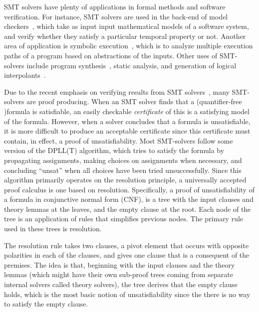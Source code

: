 \documentclass{article}
\begin{document}
	SMT solvers have plenty of applications in formal methods 
	and software verification. For instance, SMT solvers are used 
	in the back-end of model checkers~\cite{DBLP:books/daglib/0020348}, 
	which take as input input mathematical 
	models of a software system, and verify whether they 
	satisfy a particular temporal property or not. Another area of application is symbolic
	execution~\cite{DBLP:journals/csur/BaldoniCDDF18}, 
	which is to analyze multiple execution paths of a program 
	based on abstractions of the inputs. Other uses of
	SMT-solvers include program synthesis~\cite{synth}, 
	static analysis, and generation of logical interpolants~\cite{DBLP:journals/corr/abs-1111-5652}.
	
	Due to the recent emphasis on verifying results from SMT solvers~\cite{10.1145/1670412.1670413,
	mansur2020detecting, 10.1007/978-3-642-38916-0_3},
	many SMT-solvers are proof producing. When an 
	SMT solver finds that a (quantifier-free )formula is satisfiable, an easily checkable \emph{certificate} 
	of this is a satisfying model of the formula.
	However, when a solver 
	concludes that a formula is unsatisfiable, it is more difficult 
	to produce an acceptable certificate since this 
	certificate must contain, in effect, a proof of unsatisfiability. Most SMT-solvers 
	follow some version of the DPLL(T) algorithm, which tries
	to satisfy the formula by propagating assignments, making 
	choices on assignments when necessary, and concluding ``unsat''
	when all choices have been tried unsuccessfully. 
	Since this algorithm 
	primarily operates on the resolution principle, 
	a universally accepted proof calculus is one based 
	on resolution. Specifically, a proof of unsatisfiability 
	of a formula in conjunctive normal form (CNF), is a tree 
	with the input clauses and theory lemmas at the leaves, 
	and the empty clause at the root. Each node of the 
	tree is an application of rules that simplifies previous 
	nodes. The primary rule used in these trees is 
	resolution.
	
	The resolution rule takes two clauses, a pivot element 
	that occurs with opposite polarities in each of the 
	clauses, and gives one clause that is a consequent 
	of the premises. The idea is that, beginning 
	with the input clauses and the theory lemmas (which might 
	have their own sub-proof trees coming from separate 
	internal solvers called theory solvers), 
	the tree derives that the empty clause holds, which is the 
	most basic notion of unsatisfiability since the there 
	is no way to satisfy the empty clause.
	
\end{document}
